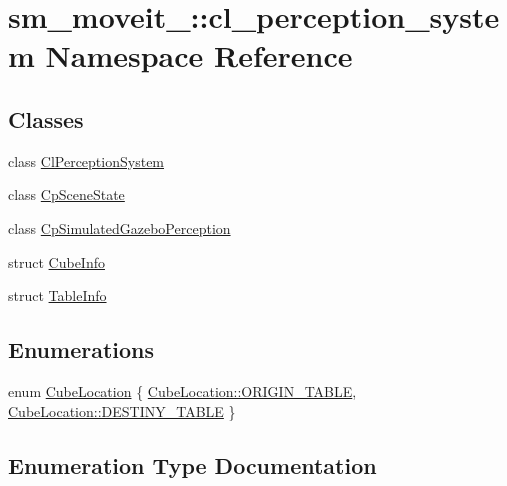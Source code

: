 \hypertarget{namespacesm__moveit__4_1_1cl__perception__system}{}\section{sm\+\_\+moveit\+\_\+:\+:cl\+\_\+perception\+\_\+system Namespace Reference}
\label{namespacesm__moveit__4_1_1cl__perception__system}
\subsection*{Classes}
\begin{DoxyCompactItemize}
\item 
class \hyperlink{classsm__moveit__4_1_1cl__perception__system_1_1ClPerceptionSystem}{Cl\+Perception\+System}
\item 
class \hyperlink{classsm__moveit__4_1_1cl__perception__system_1_1CpSceneState}{Cp\+Scene\+State}
\item 
class \hyperlink{classsm__moveit__4_1_1cl__perception__system_1_1CpSimulatedGazeboPerception}{Cp\+Simulated\+Gazebo\+Perception}
\item 
struct \hyperlink{structsm__moveit__4_1_1cl__perception__system_1_1CubeInfo}{Cube\+Info}
\item 
struct \hyperlink{structsm__moveit__4_1_1cl__perception__system_1_1TableInfo}{Table\+Info}
\end{DoxyCompactItemize}
\subsection*{Enumerations}
\begin{DoxyCompactItemize}
\item 
enum \hyperlink{namespacesm__moveit__4_1_1cl__perception__system_a0d1b8834532a7cf9d19670791eece6d1}{Cube\+Location} \{ \hyperlink{namespacesm__moveit__4_1_1cl__perception__system_a0d1b8834532a7cf9d19670791eece6d1ae5ee34c3ef8ec4a46a00a218416c7b1d}{Cube\+Location\+::\+O\+R\+I\+G\+I\+N\+\_\+\+T\+A\+B\+LE}, 
\hyperlink{namespacesm__moveit__4_1_1cl__perception__system_a0d1b8834532a7cf9d19670791eece6d1acdc3fdda18904b4a1ac0be036c86f973}{Cube\+Location\+::\+D\+E\+S\+T\+I\+N\+Y\+\_\+\+T\+A\+B\+LE}
 \}
\end{DoxyCompactItemize}


\subsection{Enumeration Type Documentation}
\mbox{\label{namespacesm__moveit__4_1_1cl__perception__system_a0d1b8834532a7cf9d19670791eece6d1}} 
